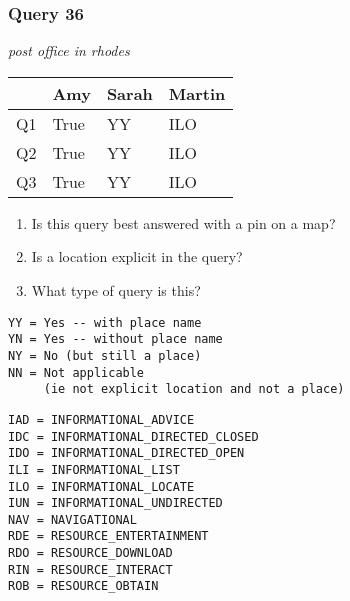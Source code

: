 \begin{frame}[fragile]
\frametitle{Query 36}
\vspace{1em}

\emph{post office in rhodes}

\vfill

\begin{table}
  \centering
  \begin{tabular}{ l l l l }
    & \textbf{Amy} & \textbf{Sarah} & \textbf{Martin}\\
    \toprule
    Q1 & True & YY & ILO\\
Q2 & True & YY & ILO\\
Q3 & True & YY & ILO\\
    \bottomrule
  \end{tabular}
\end{table}

\vfill

\tiny{

\begin{enumerate}
\item Is this query best answered with a pin on a map?
\item Is a location explicit in the query?
\item What type of query is this?
\end{enumerate}

\vfill

\begin{multicols}{2}
\begin{verbatim}
YY = Yes -- with place name
YN = Yes -- without place name
NY = No (but still a place)
NN = Not applicable 
     (ie not explicit location and not a place)
\end{verbatim}

\columnbreak
\begin{verbatim}
IAD = INFORMATIONAL_ADVICE
IDC = INFORMATIONAL_DIRECTED_CLOSED
IDO = INFORMATIONAL_DIRECTED_OPEN
ILI = INFORMATIONAL_LIST
ILO = INFORMATIONAL_LOCATE
IUN = INFORMATIONAL_UNDIRECTED
NAV = NAVIGATIONAL
RDE = RESOURCE_ENTERTAINMENT
RDO = RESOURCE_DOWNLOAD
RIN = RESOURCE_INTERACT
ROB = RESOURCE_OBTAIN
\end{verbatim}
\end{multicols}
}

\end{frame}


